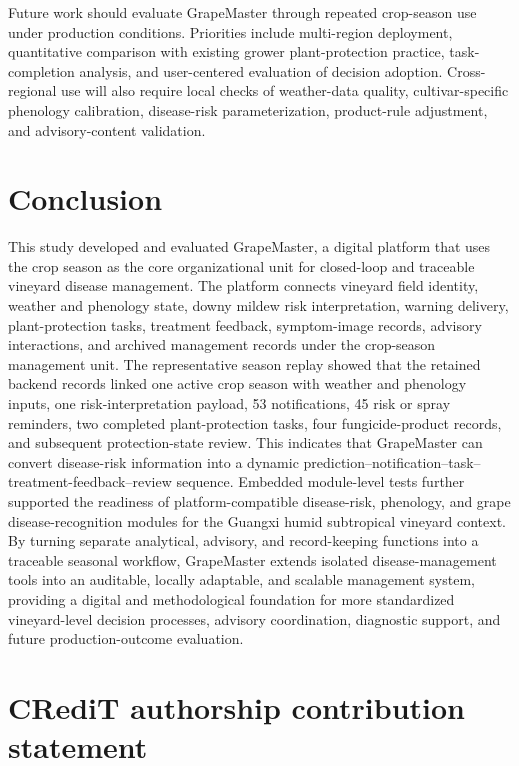 \documentclass[12pt]{article}
\begin{document}
Future work should evaluate GrapeMaster through repeated crop-season use under production conditions. Priorities include multi-region deployment, quantitative comparison with existing grower plant-protection practice, task-completion analysis, and user-centered evaluation of decision adoption. Cross-regional use will also require local checks of weather-data quality, cultivar-specific phenology calibration, disease-risk parameterization, product-rule adjustment, and advisory-content validation.

\section{Conclusion}\label{conclusion}

This study developed and evaluated GrapeMaster, a digital platform that uses the crop season as the core organizational unit for closed-loop and traceable vineyard disease management. The platform connects vineyard field identity, weather and phenology state, downy mildew risk interpretation, warning delivery, plant-protection tasks, treatment feedback, symptom-image records, advisory interactions, and archived management records under the crop-season management unit. The representative season replay showed that the retained backend records linked one active crop season with weather and phenology inputs, one risk-interpretation payload, 53 notifications, 45 risk or spray reminders, two completed plant-protection tasks, four fungicide-product records, and subsequent protection-state review. This indicates that GrapeMaster can convert disease-risk information into a dynamic prediction--notification--task--treatment-feedback--review sequence. Embedded module-level tests further supported the readiness of platform-compatible disease-risk, phenology, and grape disease-recognition modules for the Guangxi humid subtropical vineyard context. By turning separate analytical, advisory, and record-keeping functions into a traceable seasonal workflow, GrapeMaster extends isolated disease-management tools into an auditable, locally adaptable, and scalable management system, providing a digital and methodological foundation for more standardized vineyard-level decision processes, advisory coordination, diagnostic support, and future production-outcome evaluation.

\section*{CRediT authorship contribution statement}
\end{document}
